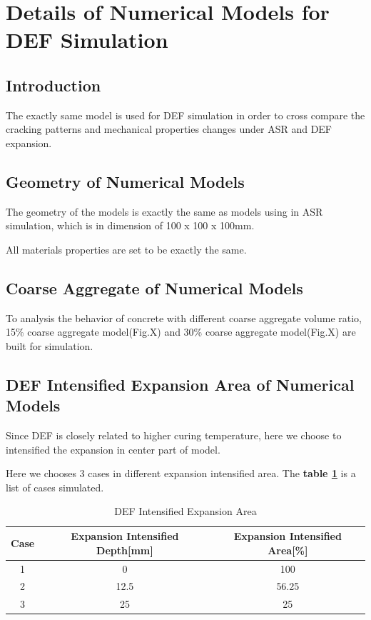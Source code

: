 
\section{Details of Numerical Models for DEF Simulation}

\subsection{Introduction}

The exactly same model is used for DEF simulation in order to cross compare the cracking patterns and mechanical properties changes under ASR and DEF expansion.

\subsection{Geometry of Numerical Models}

The geometry of the models is exactly the same as models using in ASR simulation, which is in dimension of 100 x 100 x 100mm.

All materials properties are set to be exactly the same.

\subsection{Coarse Aggregate of Numerical Models}

To analysis the behavior of concrete with different coarse aggregate volume ratio, 15\% coarse aggregate model(Fig.X) and 30\% coarse aggregate model(Fig.X) are built for simulation.

\subsection{DEF Intensified Expansion Area of Numerical Models}

Since DEF is closely related to higher curing temperature, here we choose to intensified the expansion in center part of model.

Here we chooses 3 cases in different expansion intensified area. The \textbf{table \ref{table:DEF_X}} is a list of cases simulated.

\begin{table}[ht!]
\centering
\begin{tabular}{||c c c||}
 \hline
 Case &  Expansion Intensified Depth[mm] &  Expansion Intensified Area[\%] \\ [0.5ex]
 \hline\hline
 1 & 0 & 100 \\
 2 & 12.5 & 56.25 \\
 3 & 25 & 25 \\ [0.5ex]
 \hline
\end{tabular}
\caption{DEF Intensified Expansion Area}
\label{table:DEF_X}
\end{table}

